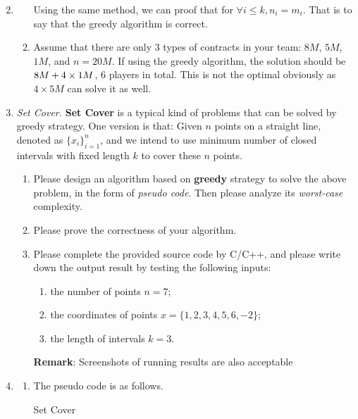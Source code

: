\documentclass[12pt,a4paper]{article}
\makeatletter
\newtheorem*{solution}{Solution}
\theoremstyle{definition}
\renewenvironment{solution}[1][Solution] {\par\pushQED{\qed}\normalfont\topsep6\p@\@plus6\p@\relax\trivlist\item[\hskip\labelsep\bfseries#1\@addpunct{.}]\ignorespaces}{\popQED\endtrivlist\@endpefalse} \makeatother
\makeatother
\begin{document}
\begin{enumerate}
\begin{solution}
\begin{enumerate}
Using the same method, we can proof that for $\forall i \leqslant k, n_i = m_i$. That is to say that the greedy algorithm is correct.

\item Assume that there are only 3 types of contracts in your team: $ 8M $, $ 5M $, $ 1M $, and $n = 20M$. If using the greedy algorithm, the solution should be $8 \time 8M + 4\times 1M$, 6 players in total. This is not the optimal obviously as $4\times 5M$ can solve it as well. 

        \end{enumerate}
    \end{solution}
	
    \item \textit{Set Cover.} \textbf{Set Cover} is a typical kind of problems that can be solved by greedy strategy. One version is that: Given $n$ points on a straight line, denoted as $\{x_i\}_{i=1}^n$, and we intend to use minimum number of closed intervals with fixed length $k$ to cover these $n$ points.
    \begin{enumerate}
    	\item Please design an algorithm based on \textbf{greedy} strategy to solve the above problem, in the form of \emph{pseudo code}. Then please analyze its \emph{worst-case} complexity.
    	\item Please prove the correctness of your algorithm.
    	\item Please complete the provided source code by C/C++, and please write down the output result by testing the following inputs: 
    	\begin{enumerate}
    		\item the number of points $n=7$;
    		\item the coordinates of points
    		$x=\{1,2,3,4,5,6,-2\}$;
    		\item the length of intervals
    		$k=3$.
    	\end{enumerate}
        \textbf{Remark}: Screenshots of running results are also acceptable 
    \end{enumerate}
    \begin{solution}
        \begin{enumerate}
        \item The pseudo code is as follows.\\
        \begin{minipage}[t]{0.88\textwidth}
        \begin{algorithm}[H]
		\caption{Set Cover}\label{Alg-SetCover}
		

\end{algorithm}
\end{minipage}
\end{enumerate}
\end{solution}
\end{enumerate}
\end{document}
